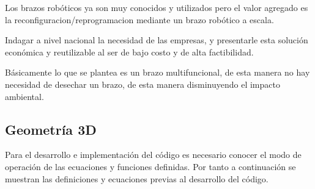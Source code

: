 \documentclass[main.tex]{subfiles}
\begin{document}
Los brazos robóticos ya son muy conocidos y utilizados pero el
valor agregado es la reconfiguracion/reprogramacion mediante un
brazo robótico a escala.

Indagar a nivel nacional la necesidad de las empresas, y presentarle
esta solución económica y reutilizable al ser de bajo costo y de alta
factibilidad.

Básicamente lo que se plantea es un brazo multifuncional, de esta manera
no hay necesidad de desechar un brazo, de esta manera disminuyendo el
impacto ambiental.


\subsection{Geometría 3D}
Para el desarrollo e implementación del código es necesario conocer
el modo de operación de las ecuaciones y funciones definidas. Por
tanto a continuación se muestran las definiciones y ecuaciones
previas al desarrollo del código.
\end{document}
